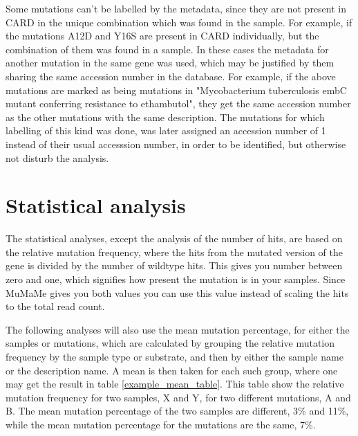 Some mutations can't be labelled by the metadata, since they are not present in CARD in the unique combination which was found in the sample. 
For example, if the mutations A12D and Y16S are present in CARD individually, but the combination of them was found in a sample. In these cases the metadata for another mutation in the same gene was used, which may be justified by them sharing the same accession number in the database. 
For example, if the above mutations are marked as being mutations in "Mycobacterium tuberculosis embC mutant conferring resistance to ethambutol", they get the same accession number as the other mutations with the same description. 
The mutations for which labelling of this kind was done, was later assigned an accession number of 1 instead of their usual accesssion number, in order to be identified, but otherwise not disturb the analysis. 

\section{Statistical analysis}

The statistical analyses, except the analysis of the number of hits, are based on the relative mutation frequency, where the hits from the mutated version of the gene is divided by the number of wildtype hits. 
This gives you number between zero and one, which signifies how present the mutation is in your samples.
Since MuMaMe gives you both values you can use this value instead of scaling the hits to the total read count. 

The following analyses will also use the mean mutation percentage, for either the samples or mutations, which are calculated by grouping the relative mutation frequency by the sample type or substrate, and then by either the sample name or the description name. 
A mean is then taken for each such group, where one may get the result in table \ref{example_mean_table}. This table show the relative mutation frequency for two samples, X and Y, for two different mutations, A and B. 
The mean mutation percentage of the two samples are different, 3\% and 11\%, while the mean mutation percentage for the mutations are the same, 7\%.


